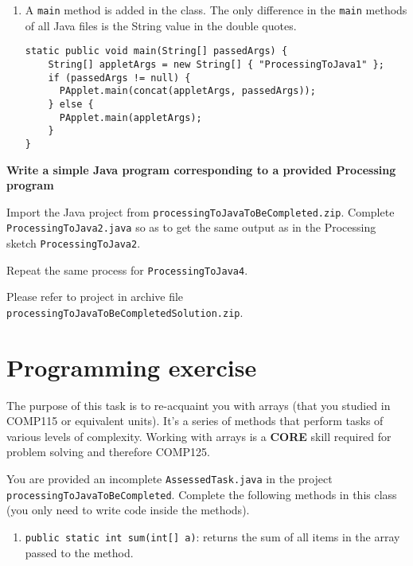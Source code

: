 \begin{questions}
\begin{solution}
\begin{enumerate}
\item A \texttt{main} method is added in the class. The only difference in the \texttt{main} methods of all Java files is the String value in the double quotes.
\begin{lstlisting}  
static public void main(String[] passedArgs) {
    String[] appletArgs = new String[] { "ProcessingToJava1" };
    if (passedArgs != null) {
      PApplet.main(concat(appletArgs, passedArgs));
    } else {
      PApplet.main(appletArgs);
    }
}
\end{lstlisting}

\end{enumerate}

\end{solution}

\question \textbf{Write a simple Java program corresponding to a provided Processing program} \vskip 0.5cm

Import the Java project from \texttt{processingToJavaToBeCompleted.zip}. Complete \texttt{ProcessingToJava2.java} so as to get the same output as in the Processing sketch \texttt{ProcessingToJava2}.

Repeat the same process for \texttt{ProcessingToJava4}.

\begin{solution}
Please refer to project in archive file \texttt{processingToJavaToBeCompletedSolution.zip}.
\end{solution}

\newpage

\section*{Programming exercise}

\question The purpose of this task is to re-acquaint you with arrays (that you studied in COMP115 or equivalent units). It's a series of methods that perform tasks of various levels of complexity. Working with arrays is a \textbf{CORE} skill required for problem solving and therefore COMP125. 

You are provided an incomplete \texttt{AssessedTask.java} in the project \texttt{processingToJavaToBeCompleted}. Complete the following methods in this class (you only need to write code inside the methods). 

\begin{enumerate}
\item \texttt{public static int sum(int[] a)}: returns the sum of all items in the array passed to the method. 


\end{enumerate}
\end{questions}
